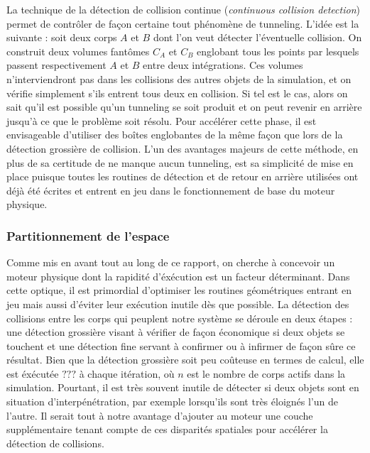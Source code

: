 \begin{figure}
  \centering
  
  \caption{}
  \label{tunneling2}
\end{figure}

La technique de la détection de collision continue (\textit{continuous
  collision detection}) permet de contrôler de façon certaine tout
phénomène de tunneling. L'idée est la suivante : soit deux corps $A$
et $B$ dont l'on veut détecter l'éventuelle collision. On construit
deux volumes fantômes $C_A$ et $C_B$ englobant tous les points par
lesquels passent respectivement $A$ et $B$ entre deux
intégrations. Ces volumes n'interviendront pas dans les collisions des
autres objets de la simulation, et on vérifie simplement s'ils entrent
tous deux en collision. Si tel est le cas, alors on sait qu'il est
possible qu'un tunneling se soit produit et on peut revenir en arrière
jusqu'à ce que le problème soit résolu. Pour accélérer cette phase, il
est envisageable d'utiliser des boîtes englobantes de la même façon
que lors de la détection grossière de collision. L'un des avantages
majeurs de cette méthode, en plus de sa certitude de ne manque aucun
tunneling, est sa simplicité de mise en place puisque toutes les
routines de détection et de retour en arrière utilisées ont déjà été
écrites et entrent en jeu dans le fonctionnement de base du moteur
physique.

\begin{figure}
  \centering
  
  \caption{}
  \label{tunneling3}
\end{figure}

\subsubsection{Partitionnement de l'espace}

Comme mis en avant tout au long de ce rapport, on cherche à concevoir
un moteur physique dont la rapidité d'éxécution est un facteur
déterminant. Dans cette optique, il est primordial d'optimiser les
routines géométriques entrant en jeu mais aussi d'éviter leur
exécution inutile dès que possible. La détection des collisions entre
les corps qui peuplent notre système se déroule en deux étapes : une
détection grossière visant à vérifier de façon économique si deux
objets se touchent et une détection fine servant à confirmer ou à
infirmer de façon sûre ce résultat. Bien que la détection grossière
soit peu coûteuse en termes de calcul, elle est éxécutée $???$ à
chaque itération, o\`u $n$ est le nombre de corps actifs dans la
simulation. Pourtant, il est très souvent inutile de détecter si deux
objets sont en situation d'interpénétration, par exemple lorsqu'ils
sont très éloignés l'un de l'autre. Il serait tout à notre avantage
d'ajouter au moteur une couche supplémentaire tenant compte de ces
disparités spatiales pour accélérer la détection de collisions.

